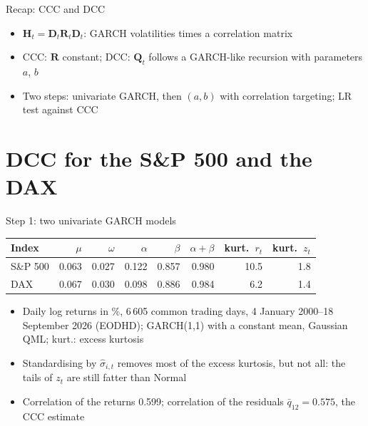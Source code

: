 \begin{frame}{Recap: CCC and DCC}
\itemsize{\small}
\begin{itemize}
    \item $\mathbf{H}_t = \mathbf{D}_t\mathbf{R}_t\mathbf{D}_t$: GARCH volatilities times a correlation matrix
    \item CCC: $\mathbf{R}$ constant; DCC: $\mathbf{Q}_t$ follows a GARCH-like recursion with parameters $a$, $b$
    \item Two steps: univariate GARCH, then $(a, b)$ with correlation targeting; LR test against CCC
\end{itemize}
\end{frame}


\section{DCC for the S\&P 500 and the DAX}

\begin{frame}{Step 1: two univariate GARCH models}
\itemsize{\footnotesize}
\begin{center}
\small
\begin{tabular}{lrrrrrrr}
\toprule
\textbf{Index} & $\mu$ & $\omega$ & $\alpha$ & $\beta$ & $\alpha + \beta$ & kurt.\ $r_t$ & kurt.\ $z_t$ \\
\midrule
S\&P 500 & 0.063 & 0.027 & 0.122 & 0.857 & 0.980 & 10.5 & 1.8 \\
DAX & 0.067 & 0.030 & 0.098 & 0.886 & 0.984 & 6.2 & 1.4 \\
\bottomrule
\end{tabular}
\end{center}
\begin{itemize}
    \item Daily log returns in \%, 6\,605 common trading days, 4 January 2000--18 September 2026 (EODHD); GARCH(1,1) with a constant mean, Gaussian QML; kurt.: excess kurtosis
    \item Standardising by $\hat\sigma_{i,t}$ removes most of the excess kurtosis, but not all: the tails of $z_t$ are still fatter than Normal
    \item Correlation of the returns 0.599; correlation of the residuals $\bar q_{12} = 0.575$, the CCC estimate
\end{itemize}
\end{frame}

